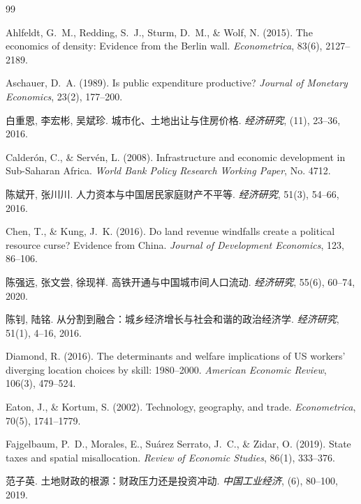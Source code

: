 \documentclass[UTF8,a4paper,12pt]{ctexart}
\theoremstyle{plain}
\theoremstyle{definition}
\theoremstyle{remark}
\begin{document}
\begin{thebibliography}{99}

Ahlfeldt, G.~M., Redding, S.~J., Sturm, D.~M., \& Wolf, N. (2015).
The economics of density: Evidence from the Berlin wall.
\textit{Econometrica}, 83(6), 2127--2189.

Aschauer, D.~A. (1989).
Is public expenditure productive?
\textit{Journal of Monetary Economics}, 23(2), 177--200.

白重恩, 李宏彬, 吴斌珍.
城市化、土地出让与住房价格.
\textit{经济研究}, (11), 23--36, 2016.

Calderón, C., \& Servén, L. (2008).
Infrastructure and economic development in Sub-Saharan Africa.
\textit{World Bank Policy Research Working Paper}, No. 4712.

陈斌开, 张川川.
人力资本与中国居民家庭财产不平等.
\textit{经济研究}, 51(3), 54--66, 2016.

Chen, T., \& Kung, J.~K. (2016).
Do land revenue windfalls create a political resource curse?
Evidence from China.
\textit{Journal of Development Economics}, 123, 86--106.

陈强远, 张文尝, 徐现祥.
高铁开通与中国城市间人口流动.
\textit{经济研究}, 55(6), 60--74, 2020.

陈钊, 陆铭.
从分割到融合：城乡经济增长与社会和谐的政治经济学.
\textit{经济研究}, 51(1), 4--16, 2016.

Diamond, R. (2016).
The determinants and welfare implications of US workers' diverging location choices by skill: 1980--2000.
\textit{American Economic Review}, 106(3), 479--524.

Eaton, J., \& Kortum, S. (2002).
Technology, geography, and trade.
\textit{Econometrica}, 70(5), 1741--1779.

Fajgelbaum, P.~D., Morales, E., Su\'{a}rez Serrato, J.~C., \& Zidar, O. (2019).
State taxes and spatial misallocation.
\textit{Review of Economic Studies}, 86(1), 333--376.

范子英.
土地财政的根源：财政压力还是投资冲动.
\textit{中国工业经济}, (6), 80--100, 2019.


\end{thebibliography}
\end{document}
